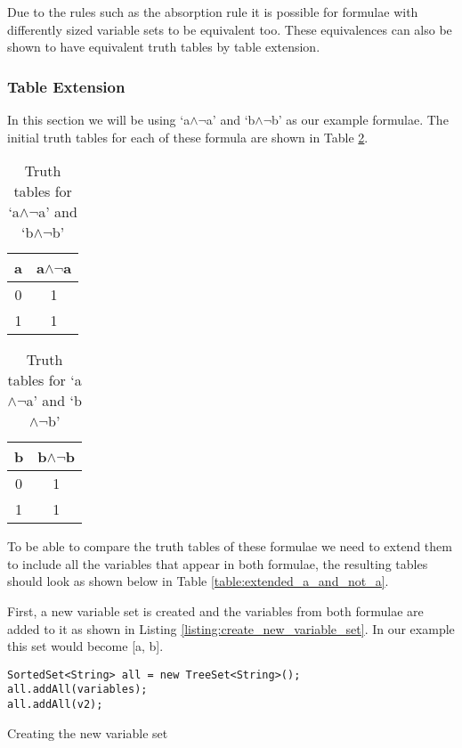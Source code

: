 \documentclass{report}
\begin{document}
Due to the rules such as the absorption rule it is possible for formulae with differently sized variable sets to be equivalent too. These equivalences can also be shown to have equivalent truth tables by table extension.

\subsubsection{Table Extension}

In this section we will be using `a$\land\lnot$a' and `b$\land\lnot$b' as our example formulae. The initial truth tables for each of these formula are shown in Table \ref{table:a_and_not_a}.

\begin{table}[h]
  \begin{center}
\begin{tabular}{ || c || c || }
      \hline
      a & a$\land\lnot$a \\ \hline
      0 & 1 \\
      1 & 1 \\
      \hline
\end{tabular}
\hspace{15mm}
\begin{tabular}{ || c || c || }
      \hline
      b & b$\land\lnot$b \\ \hline
      0 & 1 \\
      1 & 1 \\
      \hline
\end{tabular}
  \end{center}
  \caption{Truth tables for `a$\land\lnot$a' and `b$\land\lnot$b'}
  \label{table:a_and_not_a}
\end{table}

To be able to compare the truth tables of these formulae we need to extend them to include all the variables that appear in both formulae, the resulting tables should look as shown below in Table \ref{table:extended_a_and_not_a}.


First, a new variable set is created and the variables from both formulae are added to it as shown in Listing \ref{listing:create_new_variable_set}. In our example this set would become [a, b].

\begin{listing}[ht]
\begin{verbatim} 
SortedSet<String> all = new TreeSet<String>();
all.addAll(variables);
all.addAll(v2);
\end{verbatim}
\caption{Creating the new variable set}
\label{listing:create_new_variable_set}
\end{listing}
\end{document}
